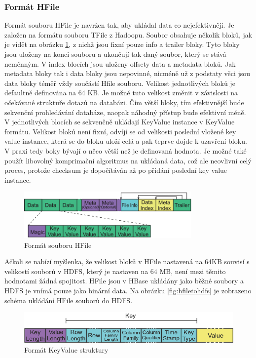 \documentclass[thesis=M,czech]{FITthesis}[2012/06/26]
\begin{document}
\subsubsection{Formát HFile}
Formát souboru HFile je navržen tak, aby ukládal data co nejefektivněji. Je založen na formátu souboru TFile z Hadoopu. Soubor obsahuje několik bloků, jak je vidět na obrázku \ref{fig:hfile}, z nichž jsou fixní pouze info a trailer bloky. Tyto bloky jsou uloženy na konci souboru a ukončují tak daný soubor, který se stává neměnným. V index blocích jsou uloženy offsety data a metadata bloků. Jak metadata bloky tak i data bloky jsou nepovinné, nicméně už z podstaty věci jsou data bloky téměř vždy součástí Hfile souboru. Velikost jednotlivých bloků je defaultně definována na 64 KB. Je možné tuto velikost změnit v závislosti na očekávané struktuře dotazů na databázi. Čím větší bloky, tím efektivnější bude sekvenční prohledávání databáze, naopak náhodný přístup bude efektivní méně. V jednotlivých blocích se sekvenčně ukládají KeyValue instance v KeyValue formátu. Velikost bloků není fixní, odvíjí se od velikosti poslední vložené key value instance, která se do bloku uloží celá a pak teprve dojde k uzavření bloku. V praxi tedy boky bývají o něco větší než je definovaná hodnota. Je možné také použít libovolný komprimační algoritmus na ukládaná data, což ale neovlivní celý proces, protože checksum je dopočítáván až po přidání poslední key value instance.
\begin{figure}[h]\centering
	\includegraphics[width=0.8\textwidth, angle=0]{files/HFile}
	\caption[Formát souboru HFile]{Formát souboru HFile}\label{fig:hfile}
\end{figure}


Ačkoli se nabízí myšlenka, že velikost bloků v HFile nastavená na 64KB souvisí s velikostí souborů v HDFS, který je nastaven na 64 MB, není mezi těmito hodnotami žádná spojitost. HFile jsou v HBase ukládány jako běžné soubory a HDFS je vnímá pouze jako binární data. Na obrázku \ref{fig:hfiletohdfs} je zobrazeno schéma ukládání HFile souborů do HDFS.

\begin{figure}[h]\centering
	\includegraphics[width=1\textwidth, angle=0]{files/key-value}
	\caption[Formát KeyValue struktury]{Formát KeyValue struktury}\label{fig:keyvalue}
\end{figure}
\end{document}
